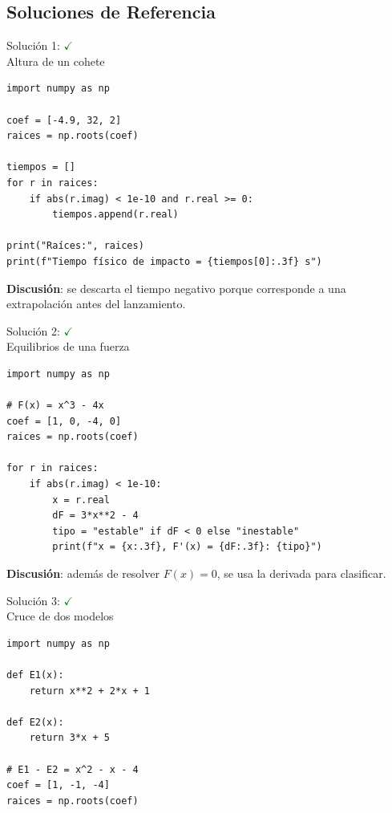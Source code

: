 \documentclass[10pt]{beamer}
\begin{document}
\begin{solutionblock}
\section{Soluciones de Referencia}

\begin{frame}[fragile]{Solución 1: \hfill \textcolor{green}{$\checkmark$} \\ Altura de un cohete}
\begin{verbatim}
import numpy as np

coef = [-4.9, 32, 2]
raices = np.roots(coef)

tiempos = []
for r in raices:
    if abs(r.imag) < 1e-10 and r.real >= 0:
        tiempos.append(r.real)

print("Raíces:", raices)
print(f"Tiempo físico de impacto = {tiempos[0]:.3f} s")
\end{verbatim}

  \textbf{Discusión}: se descarta el tiempo negativo porque corresponde a una extrapolación antes del lanzamiento.
\end{frame}

\begin{frame}[fragile]{Solución 2: \hfill \textcolor{green}{$\checkmark$} \\ Equilibrios de una fuerza}
\begin{verbatim}
import numpy as np

# F(x) = x^3 - 4x
coef = [1, 0, -4, 0]
raices = np.roots(coef)

for r in raices:
    if abs(r.imag) < 1e-10:
        x = r.real
        dF = 3*x**2 - 4
        tipo = "estable" if dF < 0 else "inestable"
        print(f"x = {x:.3f}, F'(x) = {dF:.3f}: {tipo}")
\end{verbatim}

  \textbf{Discusión}: además de resolver \(F(x)=0\), se usa la derivada para clasificar.
\end{frame}

\begin{frame}[fragile]{Solución 3: \hfill \textcolor{green}{$\checkmark$} \\ Cruce de dos modelos}
\begin{verbatim}
import numpy as np

def E1(x):
    return x**2 + 2*x + 1

def E2(x):
    return 3*x + 5

# E1 - E2 = x^2 - x - 4
coef = [1, -1, -4]
raices = np.roots(coef)


\end{verbatim}
\end{frame}
\end{solutionblock}
\end{document}
